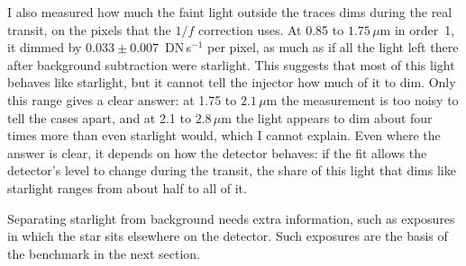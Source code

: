 I also measured how much the faint light outside the traces dims during the real transit, on the pixels that the $1/f$ correction uses. At 0.85 to $1.75\,\mu\mathrm{m}$ in order~1, it dimmed by $0.033\pm0.007$~DN\,s$^{-1}$ per pixel, as much as if all the light left there after background subtraction were starlight. This suggests that most of this light behaves like starlight, but it cannot tell the injector how much of it to dim. Only this range gives a clear answer: at 1.75 to $2.1\,\mu\mathrm{m}$ the measurement is too noisy to tell the cases apart, and at 2.1 to $2.8\,\mu\mathrm{m}$ the light appears to dim about four times more than even starlight would, which I cannot explain. Even where the answer is clear, it depends on how the detector behaves: if the fit allows the detector's level to change during the transit, the share of this light that dims like starlight ranges from about half to all of it.

Separating starlight
from background needs extra information, such as exposures in which the star
sits elsewhere on the detector. Such exposures are the basis of the benchmark
in the next section.

